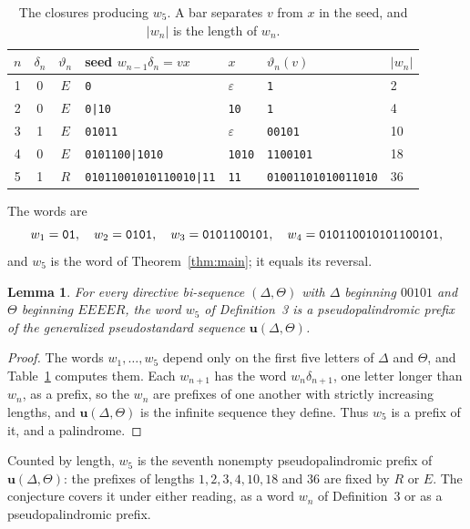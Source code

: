 \documentclass[11pt]{article}
\newtheorem{lemma}[theorem]{Lemma}
\theoremstyle{remark}
\newcommand{\w}[1]{\textup{\texttt{#1}}}
\begin{document}
\begin{table}[ht]
\centering\small
\begin{tabular}{@{}cccllll@{}}
\toprule
$n$ & $\delta_n$ & $\vartheta_n$ & seed $w_{n-1}\delta_n=vx$ & $x$ & $\vartheta_n(v)$ & $|w_n|$\\
\midrule
1 & 0 & $E$ & \w{0} & $\varepsilon$ & \w{1} & 2\\
2 & 0 & $E$ & \w{0|10} & \w{10} & \w{1} & 4\\
3 & 1 & $E$ & \w{01011} & $\varepsilon$ & \w{00101} & 10\\
4 & 0 & $E$ & \w{0101100|1010} & \w{1010} & \w{1100101} & 18\\
5 & 1 & $R$ & \w{01011001010110010|11} & \w{11} & \w{01001101010011010} & 36\\
\bottomrule
\end{tabular}
\caption{The closures producing $w_5$. A bar separates $v$ from $x$ in the
seed, and $|w_n|$ is the length of $w_n$.}
\label{tab:steps}
\end{table}

The words are
\[
w_1=\w{01},\quad w_2=\w{0101},\quad w_3=\w{0101100101},\quad
w_4=\w{010110010101100101},
\]
and $w_5$ is the word of Theorem~\ref{thm:main}; it equals its reversal.

\begin{lemma}\label{lem:member}
For every directive bi-sequence $(\Delta,\Theta)$ with $\Delta$ beginning
$00101$ and $\Theta$ beginning $EEEER$, the word $w_5$ of Definition~3 is a
pseudopalindromic prefix of the generalized pseudostandard sequence
$\mathbf u(\Delta,\Theta)$.
\end{lemma}

\begin{proof}
The words $w_1,\dots,w_5$ depend only on the first five letters of $\Delta$
and $\Theta$, and Table~\ref{tab:steps} computes them. Each $w_{n+1}$ has the
word $w_n\delta_{n+1}$, one letter longer than $w_n$, as a prefix, so the $w_n$ are prefixes of one
another with strictly increasing lengths, and $\mathbf u(\Delta,\Theta)$ is the
infinite sequence they define. Thus $w_5$ is a prefix of it, and a palindrome.
\end{proof}

\noindent Counted by length, $w_5$ is the seventh nonempty pseudopalindromic
prefix of $\mathbf u(\Delta,\Theta)$: the prefixes of lengths $1,2,3,4,10,18$
and $36$ are fixed by $R$ or $E$. The conjecture covers it under either
reading, as a word $w_n$ of Definition~3 or as a pseudopalindromic prefix.
\end{document}
